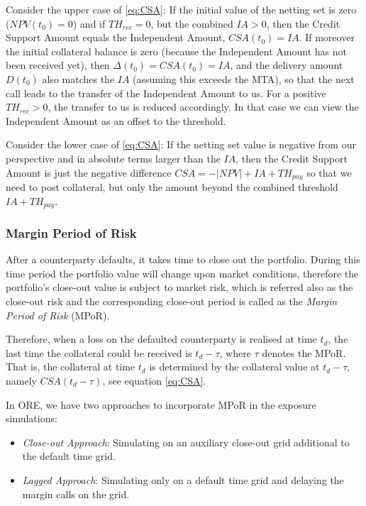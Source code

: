 \documentclass[12pt, a4paper]{article}
\newcommand{\NPV}{\mathit{NPV}}
\newcommand{\IA}{\mathit{IA}}
\newcommand{\Th}{\mathit{TH}}
\newcommand{\CSA}{\mathit{CSA}}
\begin{document}
{\begin{appendix}
Consider the upper case of \eqref{eq:CSA}: If the initial value of the netting set is zero ($\NPV(t_0)=0$) and 
if $\Th_{rec}=0$, but the combined $\IA>0$, then the Credit Support Amount equals the Independent Amount, $\CSA(t_0)=\IA$.
If moreover the initial collateral balance is zero (because the Independent Amount has not been received yet),
then $\Delta(t_0)=\CSA(t_0)=\IA$, and the delivery amount $D(t_0)$ also matches the $\IA$ (assuming this exceeds the MTA),
so that the next call leads to the transfer of the Independent Amount to us. For a positive $\Th_{rec}>0$, the transfer to us is reduced accordingly.
In that case we can view the Independent Amount as an offset to the threshold.

Consider the lower case of \eqref{eq:CSA}: If the netting set value is negative from our perspective and in absolute terms larger than the $\IA$, 
then the Credit Support Amount is just the negative difference $\CSA=-|\NPV| + \IA + \Th_{pay}$ so that we need to post collateral, but only the amount 
beyond the combined threshold $\IA + \Th_{pay}$.

\subsubsection{Margin Period of Risk} \label{sec:mpor}
After a counterparty defaults, it takes time to close out the portfolio. During this time period the portfolio value will change upon market conditions, therefore the portfolio's close-out value is subject to market risk, which is referred also as the close-out risk and the corresponding close-out period is called as the {\em Margin Period of Risk} (MPoR).  

Therefore, when a loss on the defaulted counterparty is realised at time $t_d$, the last time the collateral could be received is $t_d-\tau$, where $\tau$ denotes the MPoR. That is, the collateral at time $t_d$ is determined by the collateral value at $t_d-\tau$, namely $CSA(t_d-\tau)$, see equation \ref{eq:CSA}.

In ORE, we have two approaches to incorporate MPoR in the exposure simulations:
\begin{itemize}
 \item {\em Close-out Approach}: Simulating on an auxiliary close-out grid additional to the default time grid.
 \item {\em Lagged Approach}: Simulating only on a default time grid and delaying the margin calls on the grid.
\end{itemize}


\end{appendix}}
\end{document}

